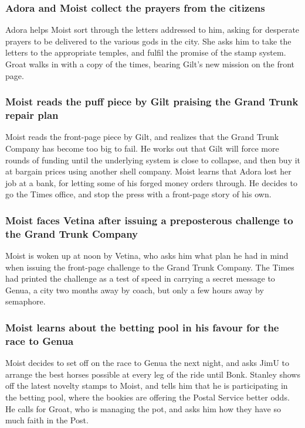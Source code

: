 \subsubsection{\Gls{Adora} and \Gls{Moist} collect the prayers from the citizens}
\Gls{Adora} helps \Gls{Moist} sort through the letters addressed to him, asking for desperate
prayers to be delivered to the various gods in the city. She asks him to take the letters to the
appropriate temples, and fulfil the promise of the stamp system. \Gls{Groat} walks in with a copy
of the times, bearing \Gls{Gilt}'s new mission on the front page.

\subsubsection{\Gls{Moist} reads the puff piece by \Gls{Gilt} praising the Grand Trunk repair plan}
\Gls{Moist} reads the front-page piece by \Gls{Gilt}, and realizes that the Grand Trunk Company has
become too big to fail. He works out that \Gls{Gilt} will force more rounds of funding until the
underlying system is close to collapse, and then buy it at bargain prices using another shell
company. \Gls{Moist} learns that \Gls{Adora} lost her job at a bank, for letting some of his
forged money orders through. He decides to go the Times office, and stop the press with a front-page
story of his own.

\subsubsection{\Gls{Moist} faces \Gls{Vetina} after issuing a preposterous challenge to the
    Grand Trunk Company}
\Gls{Moist} is woken up at noon by \Gls{Vetina}, who asks him what plan he had in mind when
issuing the front-page challenge to the Grand Trunk Company. The Times had printed the challenge as
a test of speed in carrying a secret message to Genua, a city two months away by coach, but only
a few hours away by semaphore.

\subsubsection{\Gls{Moist} learns about the betting pool in his favour for the race to Genua}
\Gls{Moist} decides to set off on the race to Genua the next night, and asks \Gls{JimU} to arrange
the best horses possible at every leg of the ride until Bonk. \Gls{Stanley} shows off the latest
novelty stamps to \Gls{Moist}, and tells him that he is participating in the betting pool, where the
bookies are offering the Postal Service better odds. He calls for \Gls{Groat}, who is managing the
pot, and asks him how they have so much faith in the Post.

